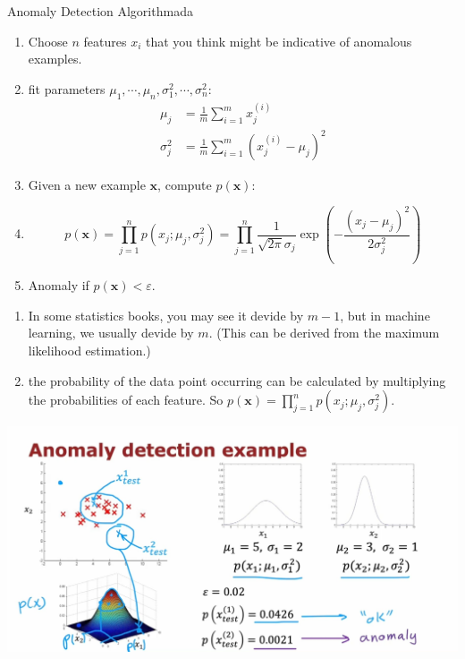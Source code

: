 \begin{thmbox}{Anomaly Detection Algorithm}{ada}
    \begin{enumerate}
        \item Choose $n$ features $x_i$ that you think might be indicative of anomalous examples.
        \item fit parameters $\mu_1,\cdots,\mu_n,\sigma_1^2,\cdots,\sigma_n^2$:
        \begin{align}
            \mu_j &= \frac{1}{m} \sum\limits_{i=1}^{m} x_j^{(i)} \\
            \sigma_j^2 &= \frac{1}{m} \sum\limits_{i=1}^{m} (x_j^{(i)} - \mu_j)^2
        \end{align}
        \item Given a new example $\mathbf{x}$, compute $p(\mathbf{x})$:
        \item[] \begin{equation}
            p(\mathbf{x}) = \prod\limits_{j=1}^{n} p(x_j;\mu_j,\sigma_j^2) 
            = \prod\limits_{j=1}^{n} \frac{1}{\sqrt{2\pi}\sigma_j} \exp\left(-\frac{(x_j-\mu_j)^2}{2\sigma_j^2}\right)
        \end{equation}
        \item Anomaly if $p(\mathbf{x}) < \varepsilon$.
    \end{enumerate}
    \begin{notebox}
        \begin{enumerate}
            \item In some statistics books, you may see it devide by $m - 1$, 
            but in machine learning, we usually devide by $m$. (This can be derived from the maximum likelihood estimation.)
            \item the probability of the data point occurring can be calculated by multiplying the probabilities of each feature.
            So $p(\mathbf{x})= \prod\limits_{j=1}^{n} p(x_j;\mu_j,\sigma_j^2)$.
        \end{enumerate}
    \end{notebox}
\end{thmbox}

\includegraphics*[width=\textwidth]{images/a4}

